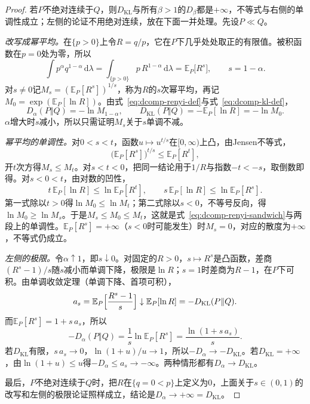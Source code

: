 \begin{proof}
若$P$不绝对连续于$Q$，则$D_{\mathrm{KL}}$与所有$\beta>1$的$D_{\beta}$都是$+\infty$，不等式与右侧的单调性成立；左侧的论证不用绝对连续，放在下面一并处理。先设$P\ll Q$。

\emph{改写成幂平均。}在$\{p>0\}$上令$R=q/p$，它在$P$下几乎处处取正的有限值。被积函数在$p=0$处为零，所以
\[
 \int p^{\alpha}q^{1-\alpha}\,\mathrm{d}\lambda=\int_{\{p>0\}}p\,R^{1-\alpha}\,\mathrm{d}\lambda=\mathbb{E}_{P}\bigl[R^{s}\bigr],\qquad s=1-\alpha .
\]
对$s\neq0$记$M_s=(\mathbb{E}_{P}[R^{s}])^{1/s}$，称为$R$的$s$次幂平均，再记$M_0=\exp(\mathbb{E}_{P}[\ln R])$。由式~\eqref{eq:dcomp-renyi-def}与式~\eqref{eq:dcomp-kl-def}，
\[
 D_{\alpha}(P\Vert Q)=-\ln M_{1-\alpha},\qquad D_{\mathrm{KL}}(P\Vert Q)=-\mathbb{E}_{P}[\ln R]=-\ln M_0 .
\]
$\alpha$增大时$s$减小，所以只需证明$M_s$关于$s$单调不减。

\emph{幂平均的单调性。}对$0<s<t$，函数$u\mapsto u^{t/s}$在$[0,\infty)$上凸，由Jensen不等式，
\[
 \bigl(\mathbb{E}_{P}[R^{s}]\bigr)^{t/s}\leq\mathbb{E}_{P}[R^{t}],
\]
开$t$次方得$M_s\leq M_t$。对$s<t<0$，把同一结论用于$1/R$与指数$-t<-s$，取倒数即得。对$s<0<t$，由对数的凹性，
\[
 t\,\mathbb{E}_{P}[\ln R]\leq\ln\mathbb{E}_{P}[R^{t}],\qquad s\,\mathbb{E}_{P}[\ln R]\leq\ln\mathbb{E}_{P}[R^{s}] .
\]
第一式除以$t>0$得$\ln M_0\leq\ln M_t$；第二式除以$s<0$，不等号反向，得$\ln M_0\geq\ln M_s$。于是$M_s\leq M_0\leq M_t$，这就是式~\eqref{eq:dcomp-renyi-sandwich}与两段上的单调性。$\mathbb{E}_{P}[R^{s}]=+\infty$（$s<0$时可能发生）时$M_s=0$，对应的散度为$+\infty$，不等式仍成立。

\emph{左侧的极限。}令$\alpha\uparrow1$，即$s\downarrow0$。对固定的$R>0$，$s\mapsto R^{s}$是凸函数，差商$(R^{s}-1)/s$随$s$减小而单调下降，极限是$\ln R$；$s=1$时差商为$R-1$，在$P$下可积。由单调收敛定理（单调下降、首项可积），
\[
 a_s=\mathbb{E}_{P}\Bigl[\frac{R^{s}-1}{s}\Bigr]\downarrow\mathbb{E}_{P}[\ln R]=-D_{\mathrm{KL}}(P\Vert Q) .
\]
而$\mathbb{E}_{P}[R^{s}]=1+s\,a_s$，所以
\[
 -D_{\alpha}(P\Vert Q)=\frac{1}{s}\ln\mathbb{E}_{P}[R^{s}]=\frac{\ln(1+s\,a_s)}{s} .
\]
若$D_{\mathrm{KL}}$有限，$s\,a_s\to0$，$\ln(1+u)/u\to1$，所以$-D_{\alpha}\to-D_{\mathrm{KL}}$。若$D_{\mathrm{KL}}=+\infty$，由$\ln(1+u)\leq u$得$-D_{\alpha}\leq a_s\to-\infty$。两种情形都有$D_{\alpha}\to D_{\mathrm{KL}}$。

最后，$P$不绝对连续于$Q$时，把$R$在$\{q=0<p\}$上定义为$0$，上面关于$s\in(0,1)$的改写和左侧的极限论证照样成立，结论是$D_{\alpha}\to+\infty=D_{\mathrm{KL}}$。
\end{proof}

